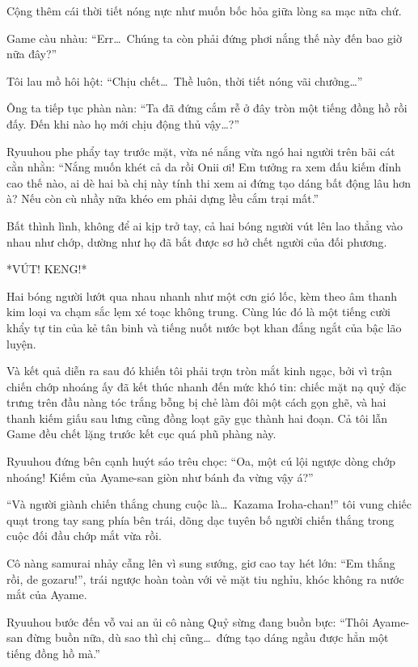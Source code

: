 \documentclass[../main.tex]{subfiles}
\begin{document}
Cộng thêm cái thời tiết nóng nực như muốn bốc hỏa giữa lòng sa mạc nữa chứ.

Game càu nhàu: ``Err\dots\ Chúng ta còn phải đứng phơi nắng thế này đến bao giờ nữa đây?''

Tôi lau mồ hôi hột: ``Chịu chết\dots\ Thề luôn, thời tiết nóng vãi chưởng\dots''

Ông ta tiếp tục phàn nàn: ``Ta đã đứng cắm rễ ở đây tròn một tiếng đồng hồ rồi đấy. Đến khi nào họ mới chịu động thủ vậy\dots?''

Ryuuhou phe phẩy tay trước mặt, vừa né nắng vừa ngó hai người trên bãi cát cằn nhằn: ``Nắng muốn khét cả da rồi Onii ơi! Em tưởng ra xem đấu kiếm đỉnh cao thế nào, ai dè hai bà chị này tính thi xem ai đứng tạo dáng bất động lâu hơn à? Nếu còn cù nhầy nữa khéo em phải dựng lều cắm trại mất.''

Bất thình lình, không để ai kịp trở tay, cả hai bóng người vút lên lao thẳng vào nhau như chớp, dường như họ đã bắt được sơ hở chết người của đối phương.

*VÚT! KENG!*

Hai bóng người lướt qua nhau nhanh như một cơn gió lốc, kèm theo âm thanh kim loại va chạm sắc lẹm xé toạc không trung. Cùng lúc đó là một tiếng cười khẩy tự tin của kẻ tân binh và tiếng nuốt nước bọt khan đắng ngắt của bậc lão luyện.

Và kết quả diễn ra sau đó khiến tôi phải trợn tròn mắt kinh ngạc, bởi vì trận chiến chớp nhoáng ấy đã kết thúc nhanh đến mức khó tin: chiếc mặt nạ quỷ đặc trưng trên đầu nàng tóc trắng bỗng bị chẻ làm đôi một cách gọn ghẽ, và hai thanh kiếm giấu sau lưng cũng đồng loạt gãy gục thành hai đoạn. Cả tôi lẫn Game đều chết lặng trước kết cục quá phũ phàng này.


Ryuuhou đứng bên cạnh huýt sáo trêu chọc: ``Oa, một cú lội ngược dòng chớp nhoáng! Kiếm của Ayame-san giòn như bánh đa vừng vậy á?''

``Và người giành chiến thắng chung cuộc là\dots\ Kazama Iroha-chan!'' tôi vung chiếc quạt trong tay sang phía bên trái, dõng dạc tuyên bố người chiến thắng trong cuộc đối đầu chớp mắt vừa rồi.

Cô nàng samurai nhảy cẫng lên vì sung sướng, giơ cao tay hét lớn: ``Em thắng rồi, de gozaru!'', trái ngược hoàn toàn với vẻ mặt tiu nghỉu, khóc không ra nước mắt của Ayame.

Ryuuhou bước đến vỗ vai an ủi cô nàng Quỷ sừng đang buồn bực: ``Thôi Ayame-san đừng buồn nữa, dù sao thì chị cũng\dots\ đứng tạo dáng ngầu được hẳn một tiếng đồng hồ mà.''
\end{document}
